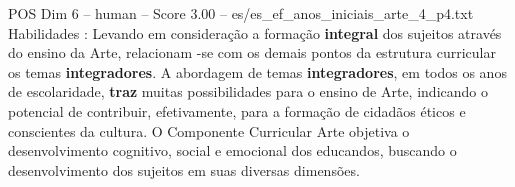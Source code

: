 \begin{textsample}{POS Dim 6 – human – Score 3.00 – es/es\_ef\_anos\_iniciais\_arte\_4\_p4.txt}  \label{ex:f6_pos_008}
Habilidades : Levando em consideração a formação \textbf{integral} dos sujeitos através do ensino da Arte, relacionam -se com os demais pontos da estrutura curricular os temas \textbf{integradores}.
A abordagem de temas \textbf{integradores}, em todos os anos de escolaridade, \textbf{traz} muitas possibilidades para o ensino de Arte, indicando o potencial de contribuir, efetivamente, para a formação de cidadãos éticos e conscientes da cultura.
O Componente Curricular Arte objetiva o desenvolvimento cognitivo, social e emocional dos educandos, buscando o desenvolvimento dos sujeitos em suas diversas dimensões.

\end{textsample}
